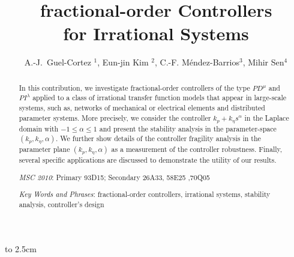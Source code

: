 \documentclass[twoside,reqno,11pt]{fcaa-var} %
\title[Fractional-Order Controllers for IS]{fractional-order Controllers  \\ [3pt] for Irrational Systems}
\author[\normalsize Guel-Cortez et al.]{\normalsize A.-J.\ Guel-Cortez $^1$, Eun-jin Kim $^2$, C.-F. M\'{e}ndez-Barrios$^3$, Mihir Sen$^4$}
\begin{document}
 \vbox to 2.5cm { \vfill }


 \bigskip \medskip

 \begin{abstract}
 	In this contribution, we investigate fractional-order controllers of the type $PD^\mu$ and $PI^\lambda$ applied to a class of irrational transfer function models that appear in large-scale systems, such as, networks of mechanical or electrical elements and distributed parameter systems. More precisely, we consider the controller $k_p+k_\eta s^\alpha$ in the Laplace domain with $-1\leq\alpha\leq1$ and present the stability analysis in the parameter-space $(k_p,k_\eta,\alpha)$. We further show details of the controller fragility analysis in the parameter plane $(k_p,k_\eta,\alpha)$ as a measurement of the controller robustness. Finally, several specific applications are discussed to demonstrate the utility of our results. %

 \medskip

{\it MSC 2010\/}: Primary 93D15; Secondary 26A33, 58E25 ,70Q05

 \smallskip

{\it Key Words and Phrases}: fractional-order controllers, irrational systems, stability analysis, controller's design

 \end{abstract}

 \maketitle

 \vspace*{-16pt}


\end{document}
